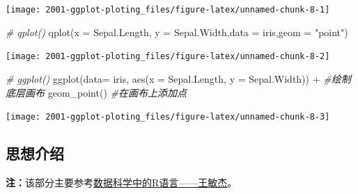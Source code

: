 \documentclass[
]{book}
\newenvironment{Shaded}{\begin{snugshade}}{\end{snugshade}}
\newcommand{\AttributeTok}[1]{\textcolor[rgb]{0.77,0.63,0.00}{#1}}
\newcommand{\CommentTok}[1]{\textcolor[rgb]{0.56,0.35,0.01}{\textit{#1}}}
\newcommand{\FunctionTok}[1]{\textcolor[rgb]{0.00,0.00,0.00}{#1}}
\newcommand{\NormalTok}[1]{#1}
\newcommand{\SpecialCharTok}[1]{\textcolor[rgb]{0.00,0.00,0.00}{#1}}
\newcommand{\StringTok}[1]{\textcolor[rgb]{0.31,0.60,0.02}{#1}}
\begin{document}
\begin{Shaded}
\end{Shaded}

\begin{center}\texttt{[image: 2001-ggplot-ploting\_files/figure-latex/unnamed-chunk-8-1]} \end{center}

\begin{Shaded}
\begin{Highlighting}[]
\CommentTok{\# qplot()}
\FunctionTok{qplot}\NormalTok{(}\AttributeTok{x =}\NormalTok{ Sepal.Length, }\AttributeTok{y =}\NormalTok{ Sepal.Width,}\AttributeTok{data =}\NormalTok{ iris,}\AttributeTok{geom =} \StringTok{"point"}\NormalTok{)}
\end{Highlighting}
\end{Shaded}

\begin{center}\texttt{[image: 2001-ggplot-ploting\_files/figure-latex/unnamed-chunk-8-2]} \end{center}

\begin{Shaded}
\begin{Highlighting}[]
\CommentTok{\# ggplot()}
\FunctionTok{ggplot}\NormalTok{(}\AttributeTok{data=}\NormalTok{ iris, }\FunctionTok{aes}\NormalTok{(}\AttributeTok{x =}\NormalTok{ Sepal.Length, }\AttributeTok{y =}\NormalTok{ Sepal.Width)) }\SpecialCharTok{+}  \CommentTok{\#绘制底层画布}
\FunctionTok{geom\_point}\NormalTok{()  }\CommentTok{\#在画布上添加点}
\end{Highlighting}
\end{Shaded}

\begin{center}\texttt{[image: 2001-ggplot-ploting\_files/figure-latex/unnamed-chunk-8-3]} \end{center}

\hypertarget{ux601dux60f3ux4ecbux7ecd}{%
\subsection{思想介绍}\label{ux601dux60f3ux4ecbux7ecd}}

\textbf{注：}该部分主要参考\href{https://bookdown.org/wangminjie/R4DS/intro-R.html\#\%E5\%AE\%89\%E8\%A3\%85-rstudio}{数据科学中的R语言------王敏杰}。
\end{document}
